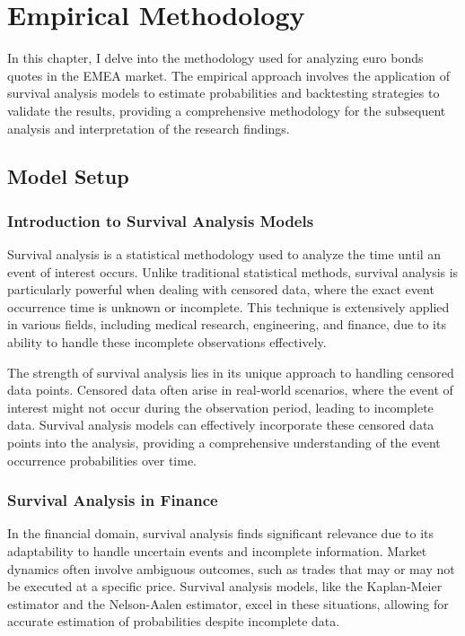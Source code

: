\chapter{Empirical Methodology} \label{Chap4}
In this chapter, I delve into the methodology used for analyzing euro bonds quotes in the EMEA market. The empirical approach involves the application of survival analysis models to estimate probabilities and backtesting strategies to validate the results, providing a comprehensive methodology for the subsequent analysis and interpretation of the research findings.

\section{Model Setup}
\subsection{Introduction to Survival Analysis Models}
Survival analysis is a statistical methodology used to analyze the time until an event of interest occurs. Unlike traditional statistical methods, survival analysis is particularly powerful when dealing with censored data, where the exact event occurrence time is unknown or incomplete. This technique is extensively applied in various fields, including medical research, engineering, and finance, due to its ability to handle these incomplete observations effectively.

The strength of survival analysis lies in its unique approach to handling censored data points. Censored data often arise in real-world scenarios, where the event of interest might not occur during the observation period, leading to incomplete data. Survival analysis models can effectively incorporate these censored data points into the analysis, providing a comprehensive understanding of the event occurrence probabilities over time.

\subsection{Survival Analysis in Finance}
In the financial domain, survival analysis finds significant relevance due to its adaptability to handle uncertain events and incomplete information. Market dynamics often involve ambiguous outcomes, such as trades that may or may not be executed at a specific price. Survival analysis models, like the Kaplan-Meier estimator and the Nelson-Aalen estimator, excel in these situations, allowing for accurate estimation of probabilities despite incomplete data.


